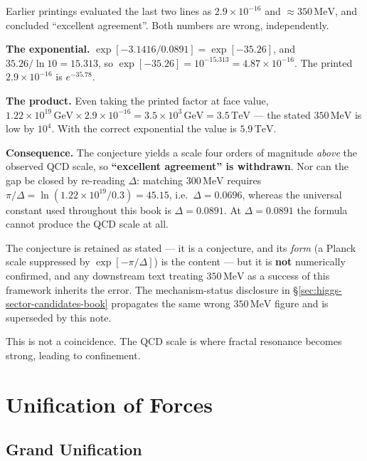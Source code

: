 \begin{remark}
\label{rem:qcd-scale-2026-10-03}
Earlier printings evaluated the last two lines as
$2.9 \times 10^{-16}$ and $\approx 350\,\mathrm{MeV}$, and concluded ``excellent
agreement''. Both numbers are wrong, independently.

\textbf{The exponential.} $\exp[-3.1416/0.0891] = \exp[-35.26]$, and
$35.26/\ln 10 = 15.313$, so $\exp[-35.26] = 10^{-15.313}
= 4.87 \times 10^{-16}$. The printed $2.9 \times 10^{-16}$ is $e^{-35.78}$.

\textbf{The product.} Even taking the printed factor at face value,
$1.22 \times 10^{19}\,\mathrm{GeV} \times 2.9 \times 10^{-16}
= 3.5 \times 10^{3}\,\mathrm{GeV} = 3.5\,\mathrm{TeV}$ --- the stated
$350\,\mathrm{MeV}$ is low by $10^{4}$. With the correct exponential the value is
$5.9\,\mathrm{TeV}$.

\textbf{Consequence.} The conjecture yields a scale four orders of magnitude
\emph{above} the observed QCD scale, so \textbf{``excellent agreement'' is
withdrawn}. Nor can the gap be closed by re-reading $\Delta$: matching
$300\,\mathrm{MeV}$ requires
$\pi/\Delta = \ln(1.22\times10^{19}/0.3) = 45.15$, i.e.\
$\Delta = 0.0696$, whereas the universal constant used throughout this book is
$\Delta = 0.0891$. At $\Delta = 0.0891$ the formula cannot produce the QCD scale
at all.

The conjecture is retained as stated --- it is a conjecture, and its \emph{form}
(a Planck scale suppressed by $\exp[-\pi/\Delta]$) is the content --- but it is
\textbf{not} numerically confirmed, and any downstream text treating
$350\,\mathrm{MeV}$ as a success of this framework inherits the error. The
mechanism-status disclosure in \S\ref{sec:higgs-sector-candidates-book}
propagates the same wrong $350\,\mathrm{MeV}$ figure and is superseded by this
note.
\end{remark}

This is not a coincidence. The QCD scale is where fractal resonance becomes strong, leading to confinement.

\section{Unification of Forces}

\subsection{Grand Unification}

